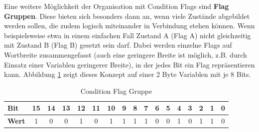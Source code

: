 \documentclass{llncs}
\begin{document}
Eine weitere Möglichkeit der Organisation mit Condition Flags sind \textbf{Flag Gruppen}. Diese bieten sich besonders dann an, wenn viele Zustände abgebildet werden sollen, die zudem logisch miteinander in Verbindung stehen können. Wenn beispielsweise etwa in einem einfachen Fall Zustand A (Flag A) nicht gleichzeitig mit Zustand B (Flag B) gesetzt sein darf. Dabei werden einzelne Flags auf Wortbreite zusammengefasst \autocite[vgl.][85]{Cooling2017} (auch eine geringere Breite ist möglich, z.B. durch Einsatz einer Variablen geringerer Breite), in der jedes Bit ein Flag repräsentieren kann. Abbildung \ref{tab:FlagGroup} zeigt dieses Konzept auf einer 2 Byte Variablen mit je 8 Bits.\\
\begin{table}[h]
	\centering %
	\def\arraystretch{1.5} %
	\setlength{\tabcolsep}{0.5em} %
		\begin{tabular}[h]{|l|c|c|c|c|c|c|c|c|c|c|c|c|c|c|c|c|}
			\hline
			\textbf{Bit} & \cellcolor{hellgrau}15 & \cellcolor{hellgrau}14 & \cellcolor{hellgrau}13 & \cellcolor{hellgrau}12 & \cellcolor{hellgrau}11 & \cellcolor{hellgrau}10 & \cellcolor{hellgrau}9 & \cellcolor{hellgrau}8 & \cellcolor{hellgrau}7 & \cellcolor{hellgrau}6 & \cellcolor{hellgrau}5 & \cellcolor{hellgrau}4 & \cellcolor{hellgrau}3 & \cellcolor{hellgrau}2 & \cellcolor{hellgrau}1 & \cellcolor{hellgrau}0 \\
			\hline
			\textbf{Wert} & 1 & 0 & 0 & 1 & 0 & 1 & 1 & 1 & 1 & 0 & 0 & 1 & 0 & 1 & 1 & 0 \\
			\hline
	\end{tabular}%
	\caption{\label{tab:FlagGroup} Condition Flag Gruppe}
\end{table}
\end{document}
